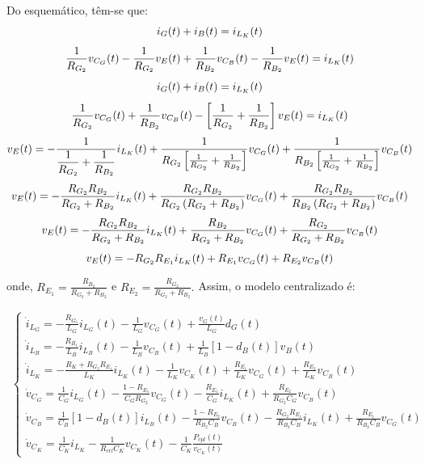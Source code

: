 \documentclass{article}
\newcommand{\ds}{\displaystyle}
\newcommand{\nle}{%
  \notag \\[4pt]
}
\begin{document}
Do esquemático, têm-se que:
\begin{gather}
  i_G(t) + i_B(t) = i_{L_K}(t) \nle
  \frac{1}{R_{G_2}} v_{C_G}(t) - \frac{1}{R_{G_2}} v_E(t) +
  \frac{1}{R_{B_2}} v_{C_B}(t) - \frac{1}{R_{B_2}} v_E(t) =  i_{L_K}(t) \nle
  i_G(t) + i_B(t) = i_{L_K}(t) \nle
  \frac{1}{R_{G_2}} v_{C_G}(t) + \frac{1}{R_{B_2}} v_{C_B}(t)
  - \left[\frac{1}{R_{G_2}} + \frac{1}{R_{B_2}}\right] v_E(t) =  i_{L_K}(t) \nle
  v_E(t) = - \frac{1}{\displaystyle \frac{1}{R_{G_2}} + \frac{1}{R_{B_2}}} i_{L_K}(t) + \frac{1}{R_{G_2} \left[\frac{1}{R_{G_2}} + \frac{1}{R_{B_2}}\right]} v_{C_G}(t) + \frac{1}{R_{B_2} \left[\frac{1}{R_{G_2}} + \frac{1}{R_{B_2}}\right]} v_{C_B}(t) \nle
  v_E(t) = - \frac{R_{G_2}R_{B_2}}{R_{G_2} + R_{B_2}} i_{L_K}(t) + \frac{R_{G_2}R_{B_2}}{R_{G_2} \left(R_{G_2} + R_{B_2}\right)} v_{C_G}(t) + \frac{R_{G_2}R_{B_2}}{R_{B_2} \left(R_{G_2} + R_{B_2}\right)}  v_{C_B}(t) \nle
  v_E(t) = - \frac{R_{G_2}R_{B_2}}{R_{G_2} + R_{B_2}} i_{L_K}(t) + \frac{R_{B_2}}{R_{G_2} + R_{B_2}} v_{C_G}(t) + \frac{R_{G_2}}{R_{G_2} + R_{B_2}}  v_{C_B}(t) \nle
  v_E(t) = - R_{G_2} R_{E_1} i_{L_K}(t) + R_{E_1} v_{C_G}(t) + R_{E_2} v_{C_B}(t)
\end{gather}

onde, $R_{E_1} = \displaystyle \frac{R_{B_2}}{R_{G_2} + R_{B_2}}$ e $R_{E_2} = \displaystyle \frac{R_{G_2}}{R_{G_2} + R_{B_2}}.$
\vspace*{2pt}
Assim, o modelo centralizado é:

\begin{gather}
  \begin{cases}
    \dot{i}_{L_G} = \ds - \frac{R_{G_1}}{L_G} i_{L_G}(t) - \frac{1}{L_G} v_{C_G}(t) + \frac{v_G(t)}{L_G} d_G(t)                                                                                                \\[12pt]
    \dot{i}_{L_B} = \ds - \frac{R_{B_1}}{L_B} i_{L_B}(t) - \frac{1}{L_B} v_{C_B} (t) + \frac{1}{L_B} \left[1 - d_B(t)\right] v_B(t)                                                                            \\[12pt]
    \dot{i}_{L_K} = \ds - \frac{R_K + R_{G_2} R_{E_1}}{L_K} i_{L_K}(t) - \frac{1}{L_K} v_{C_K}(t)  + \frac{R_{E_1}}{L_K} v_{C_G}(t) + \frac{R_{E_2}}{L_K} v_{C_B}(t)                                           \\[12pt]
    \dot{v}_{C_G} = \ds \frac{1}{C_G} i_{L_G}(t) - \frac{1 - R_{E_1}}{C_G R_{G_2}} v_{C_G}(t) - \frac{R_{E_1}}{C_G} i_{L_K}(t) + \frac{R_{E_2}}{R_{G_2} C_G} v_{C_B}(t)                                        \\[12pt]
    \dot{v}_{C_B} = \ds \frac{1}{C_B} \left[1 - d_B(t)\right] i_{L_B}(t) - \frac{1 - R_{E_2}}{R_{B_2}C_B} v_{C_B}(t) - \frac{R_{G_2} R_{E_1}}{R_{B_2} C_B} i_{L_K}(t) + \frac{R_{E_1}}{R_{B_2} C_B} v_{C_G}(t) \\[12pt]
    \dot{v}_{C_K} = \ds \frac{1}{C_K} i_{L_K} - \frac{1}{R_{crl} C_K} v_{C_K}(t) - \frac{1}{C_K} \frac{P_{cpl}(t)}{v_{C_K}(t)}
  \end{cases}
\end{gather}
\end{document}
